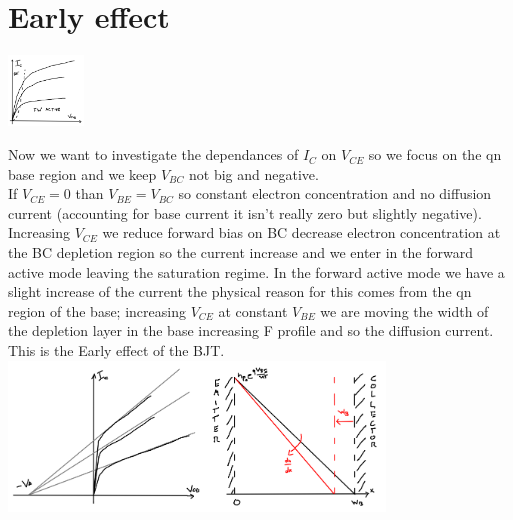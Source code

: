 \section{Early effect}

\centering
\includegraphics[width=0.15\textwidth]{bjt12.png}\\
\raggedright

Now we want to investigate the dependances of $I_C$ on $V_{CE}$ so we focus on the qn base region and we keep $V_{BC}$ not big and negative.\\
If $V_{CE}=0$ than $V_{BE}=V_{BC}$ so constant electron concentration and no diffusion current (accounting for base current it isn't really zero but slightly negative).
Increasing $V_{CE}$ we reduce forward bias on BC decrease electron concentration at the BC depletion region so the current increase and we enter in the forward active mode leaving the saturation regime.
In the forward active mode we have a slight increase of the current the physical reason for this comes from the qn region of the base; increasing $V_{CE}$ at constant $V_{BE}$ we are moving the width of the depletion layer in the base increasing F profile and so the diffusion current. This is the Early effect of the BJT.\\


\centering
\includegraphics[width=0.75\textwidth]{ear.png}\\
\raggedright


